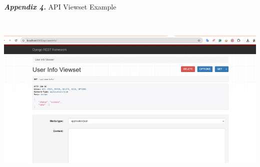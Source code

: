 \documentclass[letterpaper,twocolumn]{article}
\newcommand{\myparagraph}[1]{\vspace{0.1cm}\noindent \textbf{\textit{#1.}}}
\begin{document}
\clearpage
\myparagraph{Appendix 4} API Viewset Example

\\\textbf{}

\includegraphics[scale=0.5]{images/WhatsApp Image 2024-12-13 at 16.01.10.jpeg}\\[0.1cm] 
\end{document}
